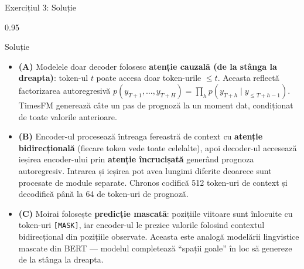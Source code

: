 \documentclass[9pt, aspectratio=169, t]{beamer}
\begin{document}
\begin{frame}{Exercițiul 3: Soluție}
    \begin{cminipage}{0.95\textwidth}
    \begin{exampleblock}{Soluție}
        {\small
        \begin{itemize}\setlength{\itemsep}{3pt}
            \item \textcolor{MainBlue}{\textbf{(A)}} Modelele doar decoder folosesc \textbf{atenție cauzală (de la stânga la dreapta)}: token-ul $t$ poate accesa doar token-urile $\leq t$. Aceasta reflectă factorizarea autoregresivă $p(y_{T+1}, \ldots, y_{T+H}) = \prod_h p(y_{T+h} \mid y_{\leq T+h-1})$. TimesFM generează câte un pas de prognoză la un moment dat, condiționat de toate valorile anterioare.
            \item \textcolor{MainBlue}{\textbf{(B)}} Encoder-ul procesează întreaga fereastră de context cu \textbf{atenție bidirecțională} (fiecare token vede toate celelalte), apoi decoder-ul accesează ieșirea encoder-ului prin \textbf{atenție încrucișată} generând prognoza autoregresiv. Intrarea și ieșirea pot avea lungimi diferite deoarece sunt procesate de module separate. Chronos codifică 512 token-uri de context și decodifică până la 64 de token-uri de prognoză.
            \item \textcolor{MainBlue}{\textbf{(C)}} Moirai folosește \textbf{predicție mascată}: pozițiile viitoare sunt înlocuite cu token-uri \texttt{[MASK]}, iar encoder-ul le prezice valorile folosind contextul bidirecțional din pozițiile observate. Aceasta este analogă modelării lingvistice mascate din BERT --- modelul completează ``spații goale'' în loc să genereze de la stânga la dreapta.
        \end{itemize}
        }
    \end{exampleblock}
    \end{cminipage}
\end{frame}
\end{document}
